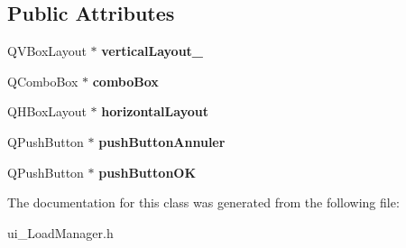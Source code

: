 \subsection*{Public Attributes}
\begin{DoxyCompactItemize}
\item 
\hypertarget{class_ui___load_manager_a778f3ad003b5e7c1f6772d978258cbe2}{Q\-V\-Box\-Layout $\ast$ {\bfseries vertical\-Layout\-\_}}\label{class_ui___load_manager_a778f3ad003b5e7c1f6772d978258cbe2}

\item 
\hypertarget{class_ui___load_manager_a654b019d063a30f7ef4e4ffef2b0692e}{Q\-Combo\-Box $\ast$ {\bfseries combo\-Box}}\label{class_ui___load_manager_a654b019d063a30f7ef4e4ffef2b0692e}

\item 
\hypertarget{class_ui___load_manager_a3e1e6e0b9f8be861dce3f9ab41f10d89}{Q\-H\-Box\-Layout $\ast$ {\bfseries horizontal\-Layout}}\label{class_ui___load_manager_a3e1e6e0b9f8be861dce3f9ab41f10d89}

\item 
\hypertarget{class_ui___load_manager_a100f2dc00ba61de872caaef657304d82}{Q\-Push\-Button $\ast$ {\bfseries push\-Button\-Annuler}}\label{class_ui___load_manager_a100f2dc00ba61de872caaef657304d82}

\item 
\hypertarget{class_ui___load_manager_ab25d7d38f5b7a0d65cb27970dc5834e2}{Q\-Push\-Button $\ast$ {\bfseries push\-Button\-O\-K}}\label{class_ui___load_manager_ab25d7d38f5b7a0d65cb27970dc5834e2}

\end{DoxyCompactItemize}


The documentation for this class was generated from the following file\-:\begin{DoxyCompactItemize}
\item 
ui\-\_\-\-Load\-Manager.\-h\end{DoxyCompactItemize}
